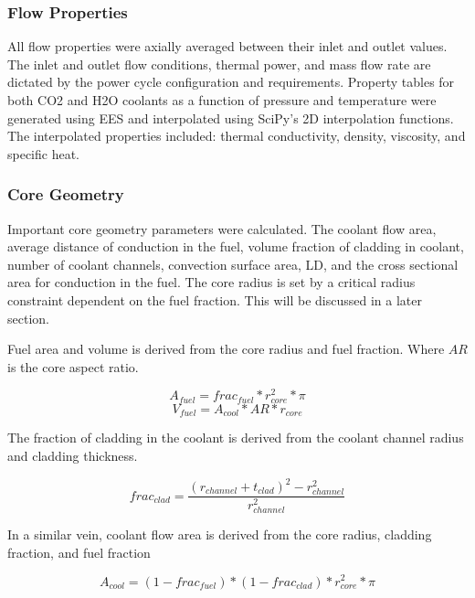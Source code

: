 \subsubsection{Flow Properties}
All flow properties were axially averaged between their inlet and outlet values.
The inlet and outlet flow conditions, thermal power, and mass flow rate are
dictated by the power cycle configuration and requirements. Property tables for
both CO2 and H2O coolants as a function of pressure and temperature were 
generated using EES and interpolated using SciPy's 2D interpolation functions.
The interpolated properties included: thermal conductivity, density, viscosity,
and specific heat.

\subsubsection{Core Geometry}

Important core geometry parameters were calculated. The coolant flow area,
average distance of conduction in the fuel, volume fraction of cladding in
coolant, number of coolant channels, convection surface area, LD, and the cross
sectional area for conduction in the fuel. The core radius is set by a critical
radius constraint dependent on the fuel fraction. This will be discussed in a
later section.

Fuel area and volume is derived from the core radius and fuel fraction. Where
$AR$ is the core aspect ratio.

\begin{equation}
    A_{fuel} = frac_{fuel}*r_{core}^2*\pi
\end{equation}
\begin{equation}
    V_{fuel} = A_{cool}*AR*r_{core}
\end{equation}

The fraction of cladding in the coolant is derived from the coolant channel
radius and cladding thickness.

\begin{equation}
    frac_{clad} = \frac{(r_{channel} + t_{clad})^2 - r_{channel}^2}{r_{channel}^2} 
\end{equation}

In a similar vein, coolant flow area is derived from the core radius, cladding
fraction, and fuel fraction

\begin{equation}
    A_{cool} = (1-frac_{fuel})*(1-frac_{clad})*r_{core}^2*\pi
\end{equation}

